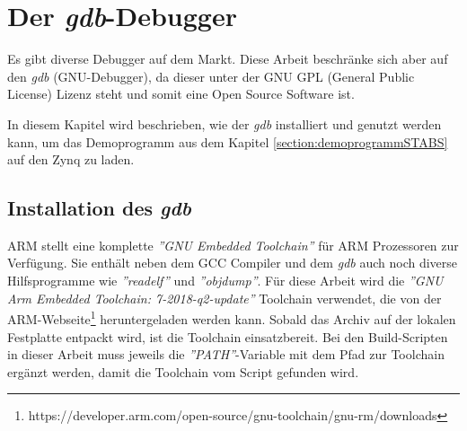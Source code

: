 \chapter{Der \textit{gdb}-Debugger}
Es gibt diverse Debugger auf dem Markt.
Diese Arbeit beschränke sich aber auf den  \textit{gdb} (GNU-Debugger), da dieser unter der GNU GPL (General Public License) Lizenz steht und somit eine Open Source Software ist.

In diesem Kapitel wird beschrieben, wie der \textit{gdb} installiert und genutzt werden kann, um das Demoprogramm aus dem Kapitel \ref{section:demoprogrammSTABS} auf den Zynq zu laden.


\section{Installation des \textit{gdb}}
ARM stellt eine komplette \textit{''GNU Embedded Toolchain''} für ARM Prozessoren zur Verfügung.
Sie enthält neben dem GCC Compiler und dem \textit{gdb} auch noch diverse Hilfsprogramme wie \textit{''readelf''} und \textit{''objdump''}.
Für diese Arbeit wird die \textit{''GNU Arm Embedded Toolchain: 7-2018-q2-update''} Toolchain verwendet, die von der ARM-Webseite\footnote{https://developer.arm.com/open-source/gnu-toolchain/gnu-rm/downloads} heruntergeladen werden kann.
Sobald das Archiv auf der lokalen Festplatte entpackt wird, ist die Toolchain einsatzbereit.
Bei den Build-Scripten in dieser Arbeit muss jeweils die \textit{''PATH''}-Variable mit dem Pfad zur Toolchain ergänzt werden, damit die Toolchain vom Script gefunden wird.


